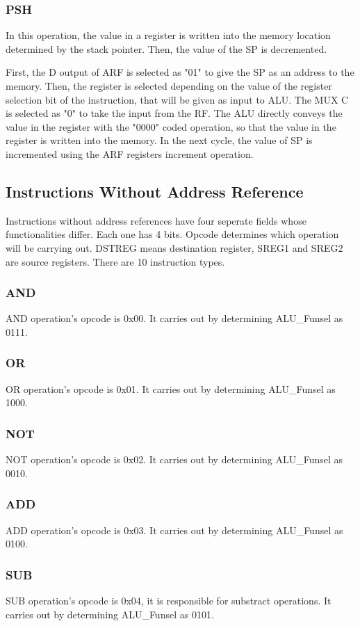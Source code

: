 \documentclass[pdftex,12pt,a4paper]{article}
\begin{document}
\subsubsection{PSH}
In this operation, the value in a register is written into the memory location determined by the stack pointer.
Then, the value of the SP is decremented.

First, the D output of ARF is selected as "01" to give the SP as an address to the memory. Then, the register is 
selected depending on the value of the register selection bit of the instruction, that will be given as input to ALU.
The MUX C is selected as "0" to take the input from the RF. The ALU directly conveys the value in the register with 
the "0000" coded operation, so that the value in the register is written into the memory. In the next cycle, the value 
of SP is incremented using the ARF registers increment operation.


\subsection{Instructions Without Address Reference}
    Instructions without address references have four seperate fields whose functionalities differ. Each one has 4 bits. Opcode determines which operation
will be carrying out. DSTREG means destination register, SREG1 and SREG2 are source registers. There are 10 instruction types.
\subsubsection{AND}
    AND operation's opcode is 0x00. It carries out by determining ALU_Funsel as 0111.
\subsubsection{OR}
    OR operation's opcode is 0x01. It carries out by determining ALU_Funsel as 1000.
\subsubsection{NOT}
    NOT operation's opcode is 0x02. It carries out by determining ALU_Funsel as 0010.
\subsubsection{ADD}
    ADD operation's opcode is 0x03. It carries out by determining ALU_Funsel as 0100.
\subsubsection{SUB}
    SUB operation's opcode is 0x04, it is responsible for substract operations. It carries out by determining ALU_Funsel as 0101.
\end{document}
